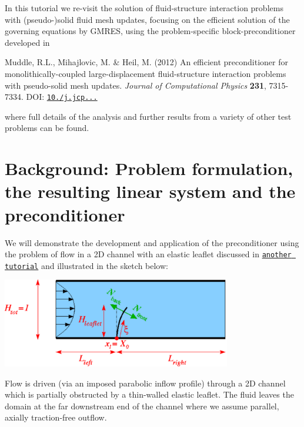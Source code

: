 In this tutorial we re-\/visit the solution of fluid-\/structure interaction problems with (pseudo-\/)solid fluid mesh updates, focusing on the efficient solution of the governing equations by G\+M\+R\+ES, using the problem-\/specific block-\/preconditioner developed in \begin{center} Muddle, R.\+L., Mihajlovic, M. \& Heil, M. (2012) An efficient preconditioner for monolithically-\/coupled large-\/displacement fluid-\/structure interaction problems with pseudo-\/solid mesh updates. {\itshape Journal of Computational Physics} {\bfseries 231}, 7315-\/7334. D\+OI\+: \href{http://dx.doi.org/10.1016/j.jcp.2012.07.001}{\tt 10./j.jcp...} \end{center}  where full details of the analysis and further results from a variety of other test problems can be found.



 

\hypertarget{index_model}{}\section{Background\+: Problem formulation, the resulting linear system and the preconditioner}\label{index_model}
We will demonstrate the development and application of the preconditioner using the problem of flow in a 2D channel with an elastic leaflet discussed in \href{../../../interaction/fsi_channel_with_leaflet/html/index.html}{\tt another tutorial} and illustrated in the sketch below\+:

 
\begin{DoxyImage}
\includegraphics[width=0.75\textwidth]{fsi_channel_with_leaflet}
\end{DoxyImage}


Flow is driven (via an imposed parabolic inflow profile) through a 2D channel which is partially obstructed by a thin-\/walled elastic leaflet. The fluid leaves the domain at the far downstream end of the channel where we assume parallel, axially traction-\/free outflow.

